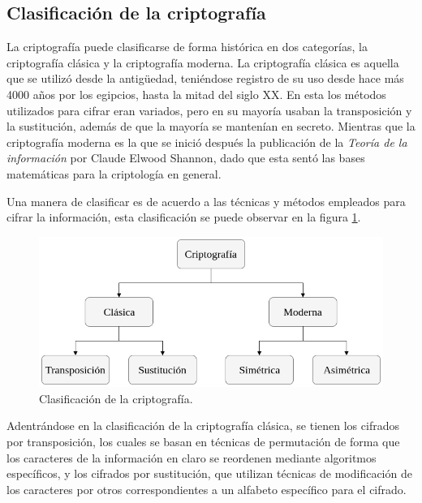 
\subsection{Clasificación de la criptografía}

  La criptografía puede clasificarse de forma histórica en dos categorías,
  la criptografía clásica y la criptografía moderna. La criptografía clásica
  es aquella que se utilizó desde la antigüedad, teniéndose registro de su
  uso desde hace más 4000 años por los egipcios, hasta la mitad del siglo
  XX. En esta los métodos utilizados para cifrar eran variados, pero en su
  mayoría usaban la transposición y la sustitución, además de que la mayoría
  se mantenían en secreto. Mientras que la criptografía moderna es la que
  se inició después la publicación de la \textit{Teoría de la información}
  por Claude Elwood Shannon, dado que esta sentó las bases matemáticas para
  la criptología en general.

  Una manera de clasificar es de acuerdo a las técnicas y métodos empleados
  para cifrar la información, esta clasificación se puede observar en la
  figura \ref{clasificacion_cripto}.

  \begin{figure}[H]
    \begin{center}
      \includegraphics[width=0.75\linewidth]
        {contenidos/antecedentes/intro/img/clasificacion_cripto.png}
      \caption{Clasificación de la criptografía.}
      \label{clasificacion_cripto}
    \end{center}
  \end{figure}

  Adentrándose en la clasificación de la criptografía clásica, se tienen los
  cifrados por transposición, los cuales se basan en técnicas de permutación
  de forma que los caracteres de la información en claro se reordenen
  mediante algoritmos específicos, y los cifrados por sustitución, que
  utilizan técnicas de modificación de los caracteres por otros
  correspondientes a un alfabeto específico para el cifrado.

